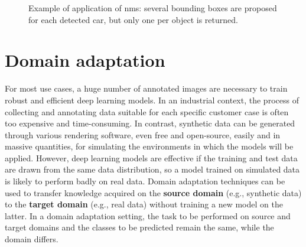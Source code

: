 \documentclass[%
    corpo=12pt,
    twoside,
    stile=classica,   
    tipotesi=magistrale,
    evenboxes,
    english,
	numerazioneromana,
]{toptesi}
\begin{document}
\begin{figure}[tb]
	\centering
	\caption{Example of application of \acrlong{nms}: several bounding boxes are proposed for each detected car, but only one per object is returned.}
	\label{fig:nms}
\end{figure}


\section{Domain adaptation}
For most use cases, a huge number of annotated images are necessary to train robust and efficient deep learning models. In an industrial context, the process of collecting and annotating data suitable for each specific customer case is often too expensive and time-consuming. In contrast, synthetic data can be generated through various rendering software, even free and open-source, easily and in massive quantities, for simulating the environments in which the models will be applied. However, deep learning models are effective if the training and test data are drawn from the same data distribution, so a model trained on simulated data is likely to perform badly on real data. Domain adaptation techniques can be used to transfer knowledge acquired on the \textbf{source domain} (e.g., synthetic data) to the \textbf{target domain} (e.g., real data) without training a new model on the latter. In a domain adaptation setting, the task to be performed on source and target domains and the classes to be predicted remain the same, while the domain differs.
\end{document}
